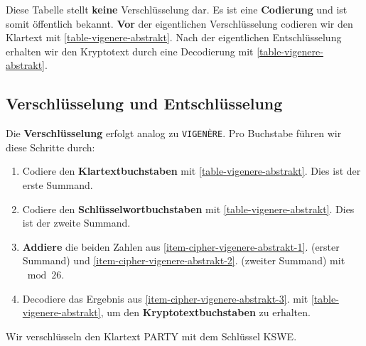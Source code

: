 Diese Tabelle stellt \textbf{keine} Verschlüsselung dar. Es ist eine \textbf{Codierung} und ist somit öffentlich bekannt. \textbf{Vor} der eigentlichen Verschlüsselung codieren wir den Klartext mit \autoref{table-vigenere-abstrakt}. Nach der eigentlichen Entschlüsselung erhalten wir den Kryptotext durch eine Decodierung mit \autoref{table-vigenere-abstrakt}.

\subsection{Verschlüsselung und Entschlüsselung}

Die \textbf{Verschlüsselung} erfolgt analog zu \texttt{VIGENÈRE}. Pro Buchstabe führen wir diese Schritte durch:

\begin{enumerate}
	\item \label{item-cipher-vigenere-abstrakt-1} Codiere den \textbf{Klartextbuchstaben} mit \autoref{table-vigenere-abstrakt}. Dies ist der erste Summand.
	\item \label{item-cipher-vigenere-abstrakt-2} Codiere den \textbf{Schlüsselwortbuchstaben} mit \autoref{table-vigenere-abstrakt}. Dies ist der zweite Summand.
	\item \label{item-cipher-vigenere-abstrakt-3} \textbf{Addiere} die beiden Zahlen aus \ref{item-cipher-vigenere-abstrakt-1}. (erster Summand) und \ref{item-cipher-vigenere-abstrakt-2}. (zweiter Summand) mit $\bmod 26$.
	\item Decodiere das Ergebnis aus \ref{item-cipher-vigenere-abstrakt-3}. mit \autoref{table-vigenere-abstrakt}, um den \textbf{Kryptotextbuchstaben} zu erhalten.
\end{enumerate}

\begin{example}
Wir verschlüsseln den Klartext PARTY mit dem Schlüssel KSWE.

\begin{table}[htb]
\end{table}
\end{example}

